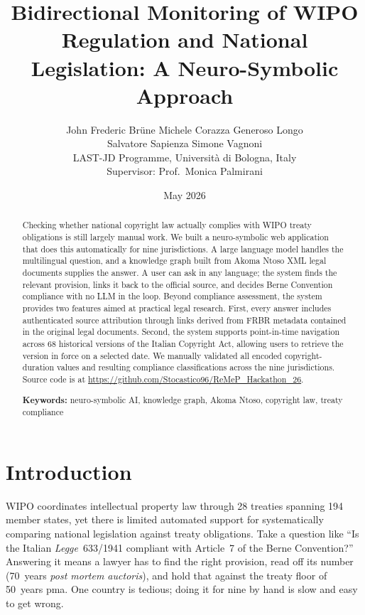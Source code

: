 \documentclass[12pt,a4paper]{article}
\title{
  \textbf{Bidirectional Monitoring of WIPO Regulation and National
  Legislation: A Neuro-Symbolic Approach}\\[0.6em]
}
\author{
  John Frederic Br\"{u}ne \quad Michele Corazza \quad Generoso Longo\\[0.2em]
  Salvatore Sapienza \quad Simone Vagnoni\\[0.4em]
  \small LAST-JD Programme, Universit\`{a} di Bologna, Italy\\[0.2em]
  \small Supervisor: Prof.\ Monica Palmirani
}
\date{May 2026}
\begin{document}
{\singlespacing\maketitle}
\thispagestyle{fancy}

\begin{abstract}
\noindent
Checking whether national copyright law actually complies with WIPO
treaty obligations is still largely manual work. We built a
neuro-symbolic web application that does this automatically for nine
jurisdictions. A large language model handles the multilingual question,
and a knowledge graph built from Akoma Ntoso XML legal documents supplies
the answer. A user can ask in any language; the system finds the relevant
provision, links it back to the official source, and decides Berne
Convention compliance with no LLM in the loop. 
Beyond compliance assessment, the system provides two features aimed at practical legal research. First, every answer includes authenticated source attribution through links derived from FRBR metadata contained in the original legal documents. Second, the system supports point-in-time navigation across 68 historical versions of the Italian Copyright Act, allowing users to retrieve the version in force on a selected date. We manually validated all encoded copyright-duration values and resulting compliance classifications across the nine jurisdictions. Source code is at
\url{https://github.com/Stocastico96/ReMeP_Hackathon_26}.

\medskip
\noindent\textbf{Keywords:} neuro-symbolic AI, knowledge graph, Akoma Ntoso, copyright law, treaty compliance
\end{abstract}

\newpage

\section{Introduction}

WIPO coordinates intellectual property law through 28 treaties spanning
194 member states, yet there is limited automated support for systematically comparing national legislation against treaty obligations. Take a
question like ``Is the Italian \emph{Legge}~633/1941 compliant with
Article~7 of the Berne Convention?'' Answering it means a lawyer has to
find the right provision, read off its number (70~years \emph{post mortem
auctoris}), and hold that against the treaty floor of 50~years pma.
One country is tedious; doing it for nine by hand is slow and easy to get
wrong.
\end{document}
